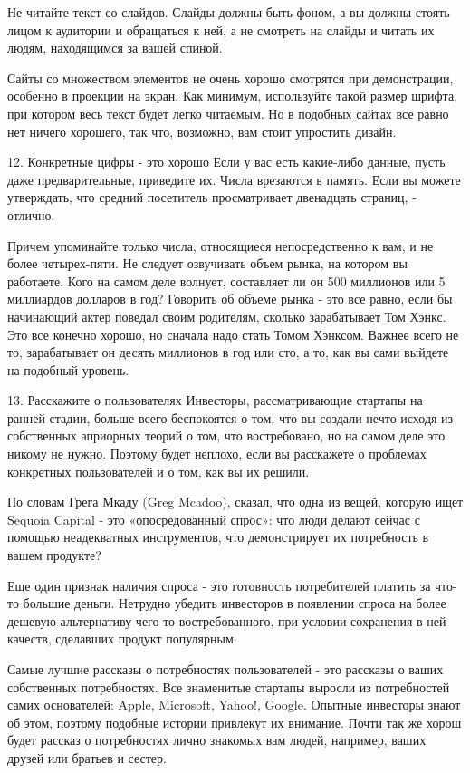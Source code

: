 \documentclass[ebook,12pt,oneside,openany]{memoir}
\begin{document}
Не читайте текст со слайдов. Слайды должны быть фоном, а вы должны
стоять лицом к аудитории и обращаться к ней, а не смотреть на слайды и
читать их людям, находящимся за вашей спиной.

Сайты со множеством элементов не очень хорошо смотрятся при
демонстрации, особенно в проекции на экран. Как минимум, используйте
такой размер шрифта, при котором весь текст будет легко читаемым. Но в
подобных сайтах все равно нет ничего хорошего, так что, возможно, вам
стоит упростить дизайн.

12. Конкретные цифры - это хорошо Если у вас есть какие-либо данные,
пусть даже предварительные, приведите их. Числа врезаются в память.
Если вы можете утверждать, что средний посетитель просматривает
двенадцать страниц, - отлично.

Причем упоминайте только числа, относящиеся непосредственно к вам, и
не более четырех-пяти. Не следует озвучивать объем рынка, на котором
вы работаете. Кого на самом деле волнует, составляет ли он 500
миллионов или 5 миллиардов долларов в год? Говорить об объеме рынка -
это все равно, если бы начинающий актер поведал своим родителям,
сколько зарабатывает Том Хэнкс. Это все конечно хорошо, но сначала
надо стать Томом Хэнксом. Важнее всего не то, зарабатывает он десять
миллионов в год или сто, а то, как вы сами выйдете на подобный
уровень.

13. Расскажите о пользователях Инвесторы, рассматривающие стартапы на
ранней стадии, больше всего беспокоятся о том, что вы создали нечто
исходя из собственных априорных теорий о том, что востребовано, но на
самом деле это никому не нужно. Поэтому будет неплохо, если вы
расскажете о проблемах конкретных пользователей и о том, как вы их
решили.

По словам Грега Мкаду (Greg Mcadoo), сказал, что одна из вещей,
которую ищет Sequoia Capital - это «опосредованный спрос»: что люди
делают сейчас с помощью неадекватных инструментов, что демонстрирует
их потребность в вашем продукте?

Еще один признак наличия спроса - это готовность потребителей платить
за что-то большие деньги. Нетрудно убедить инвесторов в появлении
спроса на более дешевую альтернативу чего-то востребованного, при
условии сохранения в ней качеств, сделавших продукт популярным.

Самые лучшие рассказы о потребностях пользователей - это рассказы о
ваших собственных потребностях. Все знаменитые стартапы выросли из
потребностей самих основателей: Apple, Microsoft, Yahoo!, Google.
Опытные инвесторы знают об этом, поэтому подобные истории привлекут их
внимание. Почти так же хорош будет рассказ о потребностях лично
знакомых вам людей, например, ваших друзей или братьев и сестер.
\end{document}
